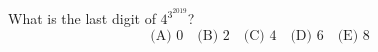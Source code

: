 What is the last digit of $4^{3^{2019}}$?
\[
\text{(A) }0\quad\text{(B) }2\quad\text{(C) }4\quad
\text{(D) }6\quad\text{(E) }8
\]
